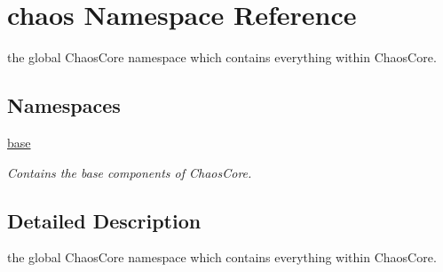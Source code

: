 \hypertarget{namespacechaos}{}\section{chaos Namespace Reference}
\label{namespacechaos}


the global Chaos\+Core namespace which contains everything within Chaos\+Core.  


\subsection*{Namespaces}
\begin{DoxyCompactItemize}
\item 
 \hyperlink{namespacechaos_1_1base}{base}
\begin{DoxyCompactList}\small\item\em Contains the base components of Chaos\+Core. \end{DoxyCompactList}\end{DoxyCompactItemize}


\subsection{Detailed Description}
the global Chaos\+Core namespace which contains everything within Chaos\+Core. 
